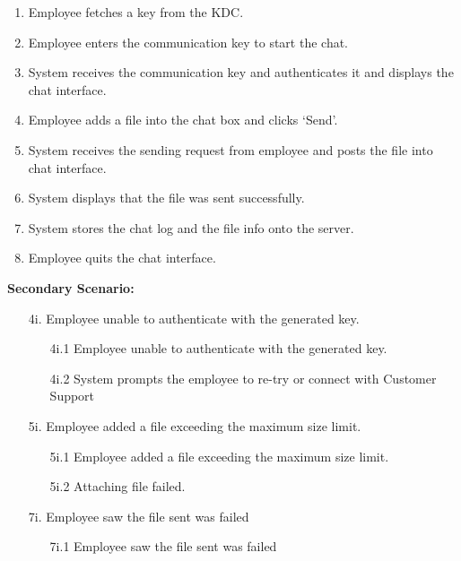 \documentclass[]{article}
\begin{document}
\begin{enumerate}[{\bf BE1.}]
\begin{enumerate}[{\bf BE7.}]
\begin{enumerate}[{  }]
\begin{enumerate}[{  1.}]
                    \item Employee fetches a key from the KDC.
                    \item Employee enters the communication key to start the chat. 
                    \item System receives the communication key and authenticates it and displays the chat interface.
                    \item Employee adds a file into the chat box and clicks ‘Send’.
                    \item System receives the sending request from employee and posts the file into chat interface. 
                    \item System displays that the file was sent successfully.
                    \item System stores the chat log and the file info onto the server.
                    \item Employee quits the chat interface.
            \end{enumerate}
        \end{enumerate}
	        \textbf{Secondary Scenario:}
                \begin{enumerate}
                    \item[4i.] Employee unable to authenticate with the generated key. 
                    \begin{enumerate}
                        \item[4i.1] Employee unable to authenticate with the generated key.
                        \item[4i.2] System prompts the employee to re-try or connect with Customer Support 
                    \end{enumerate}
                    \item[5i.] Employee added a file exceeding the maximum size limit. 
                    \begin{enumerate}
                        \item[5i.1] Employee added a file exceeding the maximum size limit. 
                        \item[5i.2] Attaching file failed.
                    \end{enumerate}
                    \item[7i.] Employee saw the file sent was failed 
                    \begin{enumerate}
                        \item[7i.1] Employee saw the file sent was failed

\end{enumerate}
\end{enumerate}
\end{enumerate}
\end{enumerate}
\end{document}
